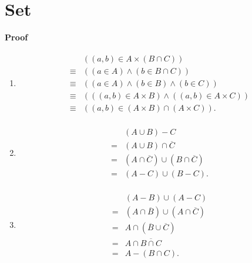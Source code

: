 \documentclass{../../cls/sig-alternate-05-2015}
\begin{document}
\section{Set}
\textbf{Proof}\begin{enumerate}[label=(\alph*)]
    \item \begin{align}
        \begin{aligned}
        & ((a, b) \in A \times (B \cap C))\\
        \equiv & ((a \in A) \land (b \in B \cap C))\\
        \equiv & ((a \in A) \land (b \in B) \land (b \in C))\\
        \equiv & (((a, b) \in A \times B) \land ((a, b) \in A \times C))\\
        \equiv & ((a, b) \in (A \times B) \cap (A \times C)).
        \end{aligned}
    \end{align}
    \item \begin{align}
        \begin{aligned}
        & (A \cup B) - C\\
        = & (A \cup B) \cap \overline{C}\\
        = & (A \cap \overline{C}) \cup (B \cap \overline{C})\\
        = & (A - C) \cup (B - C).
        \end{aligned}
    \end{align}
    \item \begin{align}
        \begin{aligned}
        & (A - B) \cup (A - C)\\
        = & (A \cap \overline{B}) \cup (A \cap \overline{C})\\
        = & A \cap (\overline{B} \cup \overline{C})\\
        = & A \cap \overline{B \cap C}\\
        = & A - (B \cap C).
        \end{aligned}
    \end{align}
\end{enumerate}
\end{document}
